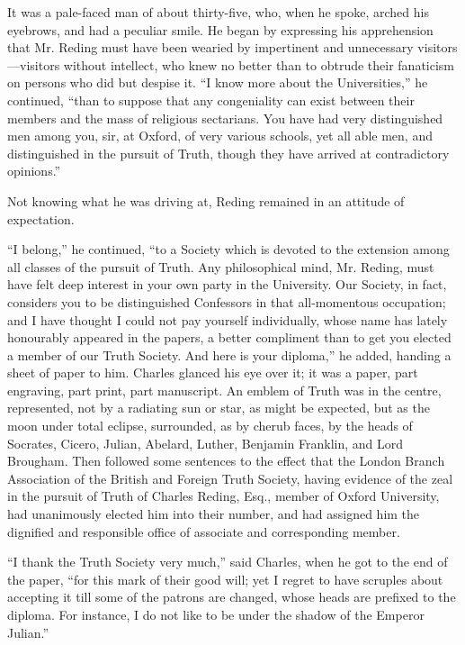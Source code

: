 It was a pale-faced man of about thirty-five, who, when he spoke,
arched his eyebrows, and had a peculiar smile. He began by expressing
his apprehension that Mr. Reding must have been wearied by
impertinent and unnecessary visitors—visitors without intellect, who
knew no better than to obtrude their fanaticism on persons who did but
despise it. ``I know more about the Universities,'' he
continued, ``than to suppose that any congeniality can exist
between their members and the mass of religious sectarians. You have
had very distinguished men among you, sir, at Oxford, of very various
schools, yet all able men, and distinguished in the pursuit of Truth,
though they have arrived at contradictory opinions.''

Not knowing what he was driving at, Reding remained in an attitude
of expectation.

``I belong,'' he continued, ``to a Society which is
devoted to the extension among all classes of the pursuit of Truth.
Any philosophical mind, Mr. Reding, must have felt deep interest in
your own party in the University. Our Society, in fact, considers you
to be distinguished Confessors in that all-momentous occupation; and I
have thought I could not pay yourself individually, whose name has
lately honourably appeared in the papers, a better compliment than to
get you elected a member of our Truth Society. And here is your
diploma,'' he added, handing a sheet of paper to him. Charles
glanced his eye over it; it was a paper, part engraving, part print,
part manuscript. An emblem of Truth was in the centre, represented,
not by a radiating sun or star, as might be expected, but as the moon
under total eclipse, surrounded, as by cherub faces, by the heads of
Socrates, Cicero, Julian, Abelard, Luther, Benjamin Franklin, and Lord
Brougham. Then followed some sentences to the effect that the
London Branch Association of the British and Foreign Truth Society,
having evidence of the zeal in the pursuit of Truth of Charles Reding,
Esq., member of Oxford University, had unanimously elected him into
their number, and had assigned him the dignified and responsible
office of associate and corresponding member.

``I thank the Truth Society very much,'' said Charles, when
he got to the end of the paper, ``for this mark of their good
will; yet I regret to have scruples about accepting it till some of
the patrons are changed, whose heads are prefixed to the diploma. For
instance, I do not like to be under the shadow of the Emperor
Julian.''

